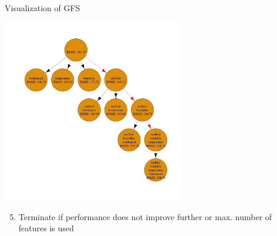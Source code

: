 \documentclass[11pt,compress,t,notes=noshow, xcolor=table]{beamer}
\begin{document}
\begin{frame}[noframenumbering]{Visualization of GFS}
    \begin{center}
      \includegraphics[width = 0.6\textwidth]{figure/fs-wrappers-powerset-tree-4.png}
      \end{center}
      \vspace{-0.2cm}
 \begin{enumerate}
     \setcounter{enumi}{4}
     \item Terminate if performance does not improve further or max. number of features is used
 \end{enumerate}
\end{frame}
  
\end{document}

